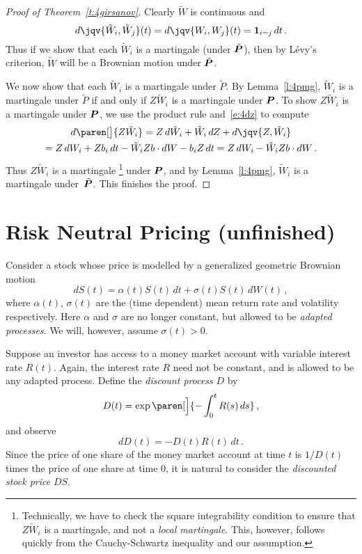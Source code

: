 \begin{proof}[Proof of Theorem~\ref{t:4girsanov}]
  Clearly $\tilde W$ is continuous and
  \begin{equation*}
    d\jqv{\tilde W_i, \tilde W_j}(t) 
      = d\jqv{W_i, W_j}(t)
      = \one_{i = j} \, dt\,.
  \end{equation*}
  Thus if we show that each $\tilde W_i$ is a martingale (under $\tilde \P$), then by L\'evy's criterion, $\tilde W$ will be a Brownian motion under $\tilde\P$.

  We now show that each $\tilde W_i$ is a martingale under $\tilde P$.
  By Lemma~\ref{l:4pmg}, $\tilde W_i$ is a martingale under $\tilde P$ if and only if $Z \tilde W_i$ is a martingale under $\P$.
  To show $Z \tilde W_i$ is a martingale under $\P$, we use the product rule and~\eqref{e:4dz} to compute
  \begin{multline*}
    d \paren[\big]{ Z \tilde W_i }
      = Z \, d\tilde W_i  + \tilde W_i \, dZ + d\jqv{Z, \tilde W_i}
  \\
      = Z \, dW_i  + Z b_i \, dt  - \tilde W_i Z b \cdot dW - b_i Z \, dt
      = Z \, dW_i - \tilde W_i Z b \cdot dW \,.
  \end{multline*}
  Thus $Z \tilde W_i$ is a martingale%
  \footnote{%
    Technically, we have to check the square integrability condition to ensure that $Z \tilde W_i$ is a martingale, and not a \emph{local martingale}.
    This, however, follows quickly from the Cauchy-Schwartz inequality and our assumption.
  }
  under $\P$, and by Lemma~\ref{l:4pmg}, $\tilde W_i$ is a martingale under~$\tilde\P$.
  This finishes the proof.
\end{proof}


\section{Risk Neutral Pricing (unfinished)}

Consider a stock whose price is modelled by a generalized geometric Brownian motion
\begin{equation*}
  dS(t) = \alpha(t) S(t) \, dt + \sigma(t) S(t) \, dW(t)\,,
\end{equation*}
where $\alpha(t)$, $\sigma(t)$ are the (time dependent) mean return rate and volatility respectively.
Here $\alpha$ and $\sigma$ are no longer constant, but allowed to be \emph{adapted processes}.
We will, however, assume $\sigma(t) > 0$.

Suppose an investor has access to a money market account with variable interest rate $R(t)$.
Again, the interest rate $R$ need not be constant, and is allowed to be any adapted process.
Define the \emph{discount process} $D$ by
\begin{equation*}
  D(t) = \exp\paren[\Big]{ - \int_0^t R(s) \, ds }\,,
\end{equation*}
and observe
\begin{equation*}
  dD(t) = -D(t) R(t) \, dt\,.
\end{equation*}
Since the price of one share of the money market account at time $t$ is $1/D(t)$ times the price of one share at time $0$, it is natural to consider the \emph{discounted stock price} $D S$.


